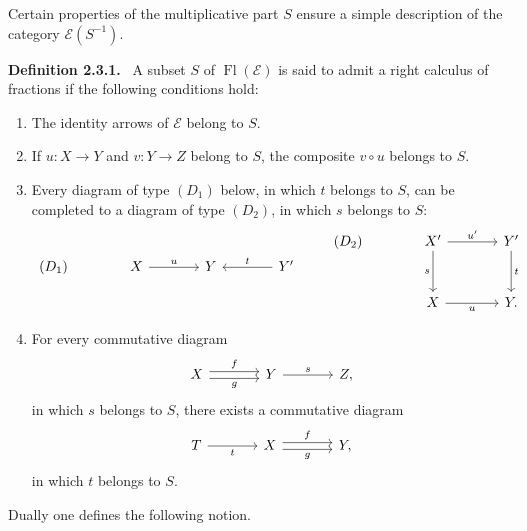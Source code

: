 \documentclass[11pt]{article}
\newenvironment{statement}[1]{\par\medskip\noindent\textbf{#1.}\ }{\par\medskip}
\providecommand{\Fl}{\operatorname{Fl}}
\providecommand{\cE}{\mathcal E}
\begin{document}
Certain properties of the multiplicative part $S$ ensure a simple description of the category $\cE(S^{-1})$.

\begin{statement}{Definition 2.3.1}
A subset $S$ of $\Fl(\cE)$ is said to admit a right calculus of fractions if the following conditions hold:
\begin{enumerate}[label=(\alph*)]
\item The identity arrows of $\cE$ belong to $S$.
\item If $u:X\to Y$ and $v:Y\to Z$ belong to $S$, the composite $v\circ u$ belongs to $S$.
\item Every diagram of type $(D_1)$ below, in which $t$ belongs to $S$, can be completed to a diagram of type $(D_2)$, in which $s$ belongs to $S$:
\[
\begin{tikzcd}[column sep=large]
(D_1)& X \arrow[r,"u"] & Y & Y' \arrow[l,"t"']
\end{tikzcd}
\qquad
\begin{tikzcd}[column sep=large,row sep=large]
(D_2)& X' \arrow[r,"u'"] \arrow[d,"s"'] & Y' \arrow[d,"t"]\\
& X \arrow[r,"u"'] & Y .
\end{tikzcd}
\]
\item For every commutative diagram
\[
\begin{tikzcd}[column sep=large]
X \arrow[r,shift left,"f"] \arrow[r,shift right,"g"'] & Y \arrow[r,"s"] & Z,
\end{tikzcd}
\]
in which $s$ belongs to $S$, there exists a commutative diagram
\[
\begin{tikzcd}[column sep=large]
T \arrow[r,"t"'] & X \arrow[r,shift left,"f"] \arrow[r,shift right,"g"'] & Y,
\end{tikzcd}
\]
in which $t$ belongs to $S$.
\end{enumerate}
\end{statement}

Dually one defines the following notion.
\end{document}
